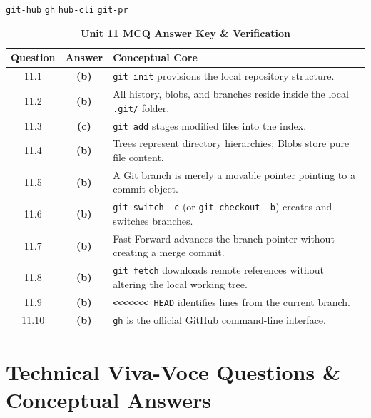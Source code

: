 {\texttt{git-hub}}
{\texttt{gh}}
{\texttt{hub-cli}}
{\texttt{git-pr}}

\begin{table}[htbp]
\centering
\caption{\textbf{Unit 11 MCQ Answer Key \& Verification}}
\begin{tabularx}{0.85\linewidth}{c c X}
\toprule
\textbf{Question} & \textbf{Answer} & \textbf{Conceptual Core} \\
\midrule
11.1 & \textbf{(b)} & \texttt{git init} provisions the local repository structure. \\
11.2 & \textbf{(b)} & All history, blobs, and branches reside inside the local \texttt{.git/} folder. \\
11.3 & \textbf{(c)} & \texttt{git add} stages modified files into the index. \\
11.4 & \textbf{(b)} & Trees represent directory hierarchies; Blobs store pure file content. \\
11.5 & \textbf{(b)} & A Git branch is merely a movable pointer pointing to a commit object. \\
11.6 & \textbf{(b)} & \texttt{git switch -c} (or \texttt{git checkout -b}) creates and switches branches. \\
11.7 & \textbf{(b)} & Fast-Forward advances the branch pointer without creating a merge commit. \\
11.8 & \textbf{(b)} & \texttt{git fetch} downloads remote references without altering the local working tree. \\
11.9 & \textbf{(b)} & \texttt{<<<<<<< HEAD} identifies lines from the current branch. \\
11.10 & \textbf{(b)} & \texttt{gh} is the official GitHub command-line interface. \\
\bottomrule
\end{tabularx}
\end{table}

\section{Technical Viva-Voce Questions \& Conceptual Answers}

